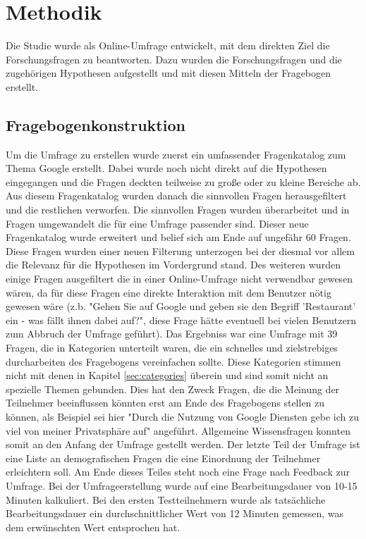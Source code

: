 %
% 

\chapter{Methodik}

Die Studie wurde als Online-Umfrage entwickelt, mit dem direkten Ziel die Forschungsfragen zu beantworten. Dazu wurden die Forschungsfragen und die zugehörigen Hypothesen aufgestellt und mit diesen Mitteln der Fragebogen erstellt.

\section{Fragebogenkonstruktion}
Um die Umfrage zu erstellen wurde zuerst ein umfassender Fragenkatalog zum Thema Google erstellt. Dabei wurde noch nicht direkt auf die Hypothesen eingegangen und die Fragen deckten teilweise zu große oder zu kleine Bereiche ab. Aus diesem Fragenkatalog wurden danach die sinnvollen Fragen herausgefiltert und die restlichen verworfen. Die sinnvollen Fragen wurden überarbeitet und in Fragen umgewandelt die für eine Umfrage passender sind. Dieser neue Fragenkatalog wurde erweitert und belief sich am Ende auf ungefähr 60 Fragen.
Diese Fragen wurden einer neuen Filterung unterzogen bei der diesmal vor allem die Relevanz für die Hypothesen im Vordergrund stand. Des weiteren wurden einige Fragen ausgefiltert die in einer Online-Umfrage nicht verwendbar gewesen wären, da für diese Fragen eine direkte Interaktion mit dem Benutzer nötig gewesen wäre (z.b. "Gehen Sie auf Google und geben sie den Begriff 'Restaurant' ein - was fällt ihnen dabei auf?", diese Frage hätte eventuell bei vielen Benutzern zum Abbruch der Umfrage geführt). Das Ergebniss war eine Umfrage mit 39 Fragen, die in Kategorien unterteilt waren, die ein schnelles und zielstrebiges durcharbeiten des Fragebogens vereinfachen sollte. Diese Kategorien stimmen nicht mit denen in Kapitel \ref{sec:categories} überein und sind somit nicht an spezielle Themen gebunden. Dies hat den Zweck Fragen, die die Meinung der Teilnehmer beeinflussen könnten erst am Ende des Fragebogens stellen zu können, als Beispiel sei hier "Durch die Nutzung von Google Diensten gebe ich zu viel von meiner Privatsphäre auf" angeführt. Allgemeine Wissensfragen konnten somit an den Anfang der Umfrage gestellt werden.
Der letzte Teil der Umfrage ist eine Liste an demografischen Fragen die eine Einordnung der Teilnehmer erleichtern soll. Am Ende dieses Teiles steht noch eine Frage nach Feedback zur Umfrage.
Bei der Umfrageerstellung wurde auf eine Bearbeitungsdauer von 10-15 Minuten kalkuliert. Bei den ersten Testteilnehmern wurde als tatsächliche Bearbeitungsdauer ein durchschnittlicher Wert von 12 Minuten gemessen, was dem erwünschten Wert entsprochen hat.

